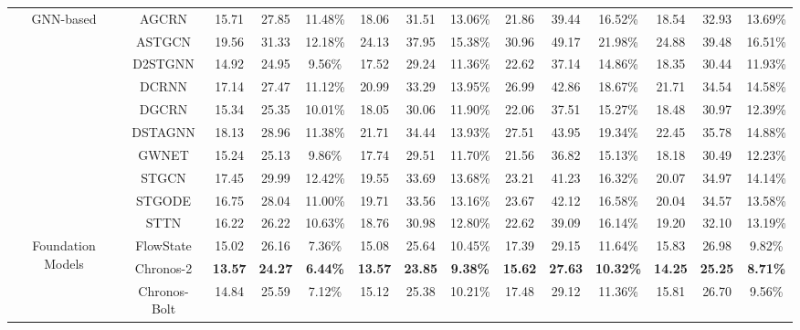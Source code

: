 \documentclass[10pt]{article}
\begin{document}
\begin{table}[t]
{\begin{tabular}{c|c|c|c|c|c|c|c|c|c|c|c|c|c}
\multirow{10}{*}{GNN-based}
& AGCRN
& 15.71 & 27.85 & 11.48\% 
& 18.06 & 31.51 & 13.06\% 
& 21.86 & 39.44 & 16.52\% 
& 18.54 & 32.93 & 13.69\% \\

& ASTGCN
& 19.56 & 31.33 & 12.18\% 
& 24.13 & 37.95 & 15.38\% 
& 30.96 & 49.17 & 21.98\% 
& 24.88 & 39.48 & 16.51\% \\

& D2STGNN
& 14.92 & 24.95 & 9.56\% 
& 17.52 & 29.24 & 11.36\% 
& 22.62 & 37.14 & 14.86\% 
& 18.35 & 30.44 & 11.93\% \\

& DCRNN
& 17.14 & 27.47 & 11.12\% 
& 20.99 & 33.29 & 13.95\% 
& 26.99 & 42.86 & 18.67\% 
& 21.71 & 34.54 & 14.58\% \\

& DGCRN
& 15.34 & 25.35 & 10.01\% 
& 18.05 & 30.06 & 11.90\% 
& 22.06 & 37.51 & 15.27\% 
& 18.48 & 30.97 & 12.39\% \\

& DSTAGNN
& 18.13 & 28.96 & 11.38\% 
& 21.71 & 34.44 & 13.93\% 
& 27.51 & 43.95 & 19.34\% 
& 22.45 & 35.78 & 14.88\% \\

& GWNET
& 15.24 & 25.13 & 9.86\% 
& 17.74 & 29.51 & 11.70\% 
& 21.56 & 36.82 & 15.13\% 
& 18.18 & 30.49 & 12.23\% \\

& STGCN
& 17.45 & 29.99 & 12.42\% 
& 19.55 & 33.69 & 13.68\% 
& 23.21 & 41.23 & 16.32\% 
& 20.07 & 34.97 & 14.14\% \\

& STGODE
& 16.75 & 28.04 & 11.00\% 
& 19.71 & 33.56 & 13.16\% 
& 23.67 & 42.12 & 16.58\% 
& 20.04 & 34.57 & 13.58\% \\

& STTN
& 16.22 & 26.22 & 10.63\% 
& 18.76 & 30.98 & 12.80\% 
& 22.62 & 39.09 & 16.14\% 
& 19.20 & 32.10 & 13.19\% \\

\midrule
\multirow{8}{*}{Foundation Models}
& FlowState
& 15.02 & 26.16 & 7.36\% 
& 15.08 & 25.64 & 10.45\% 
& 17.39 & 29.15 & 11.64\% 
& 15.83 & 26.98 & 9.82\% \\

& Chronos-2
& \textbf{13.57} & \textbf{24.27} & \textbf{6.44\%} 
& \textbf{13.57} & \textbf{23.85} & \textbf{9.38\%} 
& \textbf{15.62} & \textbf{27.63} & \textbf{10.32\%} 
& \textbf{14.25} & \textbf{25.25} & \textbf{8.71\%} \\

& Chronos-Bolt
& 14.84 & 25.59 & 7.12\% 
& 15.12 & 25.38 & 10.21\% 
& 17.48 & 29.12 & 11.36\% 
& 15.81 & 26.70 & 9.56\% \\


\end{tabular}}
\end{table}
\end{document}
